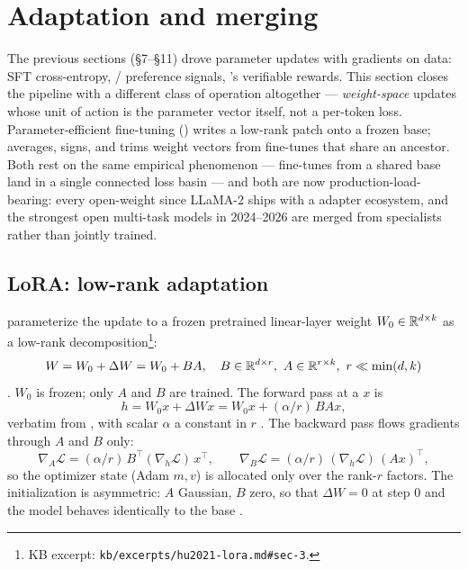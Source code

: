 
\section{Adaptation and merging}
\label{sec:adaptation-and-merging}
\label{sec:adaptation}

The previous sections (\S7--\S11) drove parameter updates with gradients
on data: SFT cross-entropy, / preference signals, 's
verifiable rewards. This section closes the pipeline with a different
class of operation altogether — \emph{weight-space} updates whose unit
of action is the parameter vector itself, not a per-token loss.
Parameter-efficient fine-tuning () writes a low-rank patch onto a
frozen base;  averages, signs, and trims weight vectors
from fine-tunes that share an ancestor. Both rest on the same
empirical phenomenon — fine-tunes from a shared base land in a single
connected loss basin — and both are now production-load-bearing: every
open-weight  since LLaMA-2 ships with a  adapter ecosystem, and
the strongest open multi-task models in 2024--2026 are merged from
specialists rather than jointly trained.

\subsection{LoRA: low-rank adaptation}
\label{sec:adapt-lora}

\citet{hu2021-lora} parameterize the update to a frozen pretrained
linear-layer weight $W_0 \in \mathbb{R}^{d \times k}$ as a low-rank
decomposition\footnote{KB excerpt:
\texttt{kb/excerpts/hu2021-lora.md\#sec-3}.}:
\begin{equation}
W = W_0 + \Delta W = W_0 + B A,
\quad
B \in \mathbb{R}^{d \times r},\ A \in \mathbb{R}^{r \times k},\ r \ll \min(d, k)
\label{eq:lora-decomp}
\end{equation}
\citep[\S 3]{hu2021-lora}. $W_0$ is frozen; only $A$ and $B$ are
trained. The forward pass at a  $x$ is
\begin{equation}
h = W_0 x + \Delta W x = W_0 x + (\alpha / r)\, B A x,
\label{eq:lora-fwd}
\end{equation}
verbatim from \citet[\S 3]{hu2021-lora}, with scalar
$\alpha$ a constant in $r$ \citep[\S 3]{hu2021-lora}. The backward pass
flows gradients through $A$ and $B$ only:
\begin{equation}
\nabla_A \mathcal{L} = (\alpha/r)\, B^\top (\nabla_h \mathcal{L})\, x^\top,
\qquad
\nabla_B \mathcal{L} = (\alpha/r)\, (\nabla_h \mathcal{L})\, (A x)^\top,
\label{eq:lora-grad}
\end{equation}
so the optimizer state (Adam $m, v$) is allocated only over the rank-$r$
factors. The initialization is asymmetric: $A$ Gaussian, $B$ zero, so
that $\Delta W = 0$ at step 0 and the model behaves identically to the
base \citep[\S 3]{hu2021-lora}.

